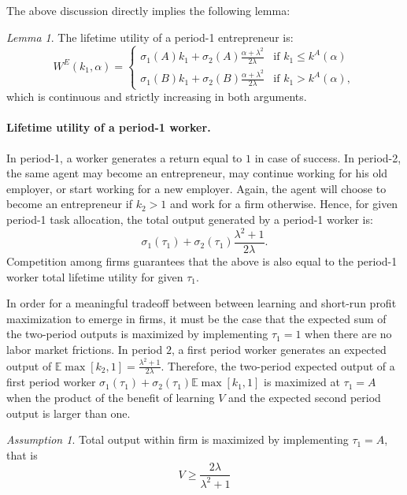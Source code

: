\documentclass[12pt,american]{paper}
\theoremstyle{remark}
\newtheorem{ass}{Assumption}
\newtheorem{lemma}{Lemma}
\begin{document}
The above discussion directly implies the following lemma:
\begin{lemma}
The lifetime utility of a period-1 entrepreneur is:
\begin{equation}\label{eq: value entrepreneur}
W^E(k_1,\alpha)=\begin{cases}
\sigma_1(A) k_1+  \sigma_2(A)  \frac{ \alpha+\lambda^2}{2\lambda} &\mbox{if } k_1\leq k^A(\alpha) \\
\sigma_1(B) k_1+  \sigma_2(B)  \frac{ \alpha+\lambda^2}{2\lambda} &\mbox{if } k_1 > k^A(\alpha), 
\end{cases}
\end{equation}
which is continuous and strictly increasing in both arguments.
\end{lemma}









\paragraph{Lifetime utility of a period-1 worker.}
In period-1, a worker generates a return equal to $1$ in case of success. In period-2, the same agent may become an entrepreneur, may continue working for his old employer, or start working for a new employer. Again, the agent will choose to become an entrepreneur if $k_2>1$ and work for a firm otherwise. Hence, for given period-1 task allocation, the total output generated by a period-1 worker is:
\[
\sigma_1(\tau_1)+\sigma_2(\tau_1)\frac{\lambda^2+1 }{2\lambda}.
\]
Competition among firms guarantees that the above is also equal to the period-1 worker total lifetime utility for given $\tau_1$. 

In order for a meaningful tradeoff between  between learning and short-run profit maximization to emerge in firms, it must be the case that the expected sum of the two-period outputs is maximized by implementing $\tau_1=1$ when there are no labor market frictions. In period $2$, a first period worker generates an expected output of $\mathbb E\max[k_2,1]=\frac{\lambda^2+1 }{2\lambda}$. Therefore, the two-period expected output of a first period worker $\sigma_1(\tau_1)+\sigma_2(\tau_1)\mathbb E\max[k_1,1]$ is maximized at $\tau_1=A$ when the product of the benefit of learning $V$ and the expected second period output is larger than one.
%
\begin{ass}\label{ass: necessary for learning}
Total output within firm is maximized by implementing $\tau_1=A$, that is
\begin{equation}
V \geq \frac{2\lambda }{\lambda^2+1}
\end{equation}
\end{ass}
\end{document}
